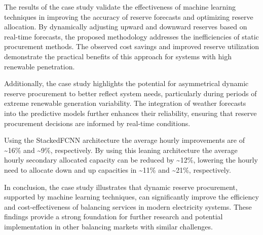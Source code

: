 The results of the case study validate the effectiveness of machine learning techniques in improving the accuracy of reserve forecasts and optimizing reserve allocation. By dynamically adjusting upward and downward reserves based on real-time forecasts, the proposed methodology addresses the inefficiencies of static procurement methods. The observed cost savings and improved reserve utilization demonstrate the practical benefits of this approach for systems with high renewable penetration.

Additionally, the case study highlights the potential for asymmetrical dynamic reserve procurement to better reflect system needs, particularly during periods of extreme renewable generation variability. The integration of weather forecasts into the predictive models further enhances their reliability, ensuring that reserve procurement decisions are informed by real-time conditions.

Using the StackedFCNN architecture the average hourly improvements are of \textasciitilde16\% and \textasciitilde9\%, respectively.
By using this leaning architecture the average hourly secondary allocated capacity can be reduced by \textasciitilde12\%, lowering the hourly need to allocate down and up capacities in \textasciitilde11\% and \textasciitilde21\%, respectively.

In conclusion, the case study illustrates that dynamic reserve procurement, supported by machine learning techniques, can significantly improve the efficiency and cost-effectiveness of balancing services in modern electricity systems. These findings provide a strong foundation for further research and potential implementation in other balancing markets with similar challenges.



%

